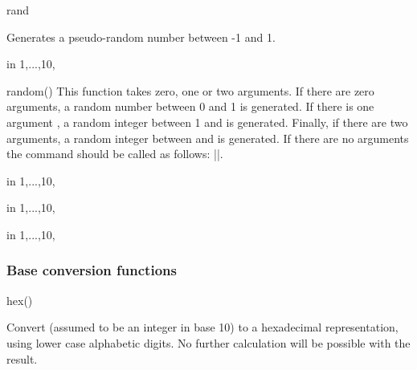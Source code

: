 \begin{math-function}{rand}
\mathcommand

	Generates a pseudo-random number between -1 and 1.

\begin{codeexample}[]
\foreach \x in {1,...,10}{\pgfmathresult, }
\end{codeexample} 

\end{math-function}

\begin{math-function}{random()}
\mathcommand
  This function takes zero, one or two arguments. If there are zero
  arguments, a random number between 0 and 1 is generated. If there is
  one argument , a random integer between 1 and  is
  generated. Finally, if there are two arguments, a random integer 
  between  and  is generated. If there are no
  arguments the \pgfname{} command should be called as follows:
  |\pgfmathrandom{}|.
  
\begin{codeexample}[]
\foreach \x in {1,...,10}{\pgfmathresult, }
\end{codeexample}

\begin{codeexample}[]
\foreach \x in {1,...,10}{\pgfmathresult, }
\end{codeexample}

\begin{codeexample}[]
\foreach \x in {1,...,10}{\pgfmathresult, }
\end{codeexample}
\end{math-function}

\subsubsection{Base conversion functions}

\label{pgfmath-functions-base}

\begin{math-function}{hex()}
\mathcommand

  Convert  (assumed to be an integer in base 10) to a
  hexadecimal representation, using lower case alphabetic digits.
	No further calculation will be possible with the result.
	
\begin{codeexample}[]
 \pgfmathresult
\end{codeexample}
\end{math-function}

